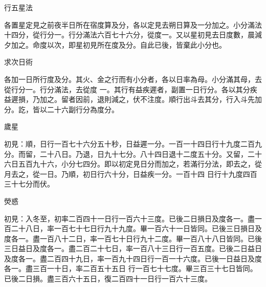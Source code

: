 \begin{pinyinscope}
 行五星法



 各置星定見之前夜半日所在宿度算及分，各以定見去朔日算及一分加之。小分滿法十四分，從行分一。行分滿法六百七十六分，從度一。又以星初見去日度數，晨減夕加之。命度以次，即星初見所在度及分。自此已後，皆棄此小分也。



 求次日術



 各加一日所行度及分。其火、金之行而有小分者，各以日率為母。小分滿其母，去從行分一。行分滿法，去從度
 一。其行有益疾遲者，副置一日行分。各以其分疾益遲損，乃加之。留者因前，退則減之，伏不注度。順行出斗去其分，行入斗先加分。訖，皆以二十六副行分為度分。



 歲星



 初見：順，日行一百七十六分五十秒，日益遲一分。一百一十四日行十九度二百九分。而留，二十八日。乃退，日九十七分。八十四日退十二度五十分。又留，二十六日五百九十六，小分七四分。即以初定見日分而加之，若滿行分法，即去之，從月去之，從一日。乃順，初日行六十分，日益疾一分。一百十四
 日行十九度四百三十七分而伏。



 熒惑



 初見：入冬至，初率二百四十一日行一百六十三度。已後二日損日及度各一。盡一百二十八日，率一百七十七日行九十九度。畢一百六十一日皆同。已後三日損日及度各一。盡一百八十二日，率一百七十日行九十二度。畢一百八十八日皆同。已後三日益日及度各一。盡二百二十七日，率一百八十三日行一百五度。已後二日益日及度各一。盡二百四十九日，率一百九十四日行一百一十六度。已後一日益日及度各一。盡三百一十日，率二百五十五日
 行一百七十七度。畢三百三十七日皆同。已後二日損。盡三百六十五日，復二百四十一日行一百六十三度。




\end{pinyinscope}
